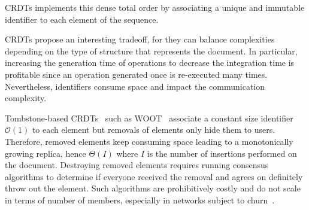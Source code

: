 CRDTs implements this dense total order by associating a unique and immutable
identifier to each element of the sequence.


\noindent CRDTs propose an interesting tradeoff, for they can balance
complexities depending on the type of structure that represents the document.
In particular, increasing the generation time of operations to decrease the
integration time is profitable since an operation generated once is re-executed
many times. Nevertheless, identifiers consume space and impact the communication
complexity.

Tombstone-based CRDTs~\cite{ahmed2011evaluating, %
  grishchenko2010deep, oster2006data, roh2011replicated, weiss2007wooki,
  wu2010partial, yu2012stringwise} such as WOOT~\cite{oster2006data} associate a
constant size identifier $\mathcal{O}(1)$ to each element but removals of
elements only hide them to users. Therefore, removed elements keep consuming
space leading to a monotonically growing replica, hence $\Theta(I)$ where $I$ is
the number of insertions performed on the document.  Destroying removed elements
requires running consensus algorithms to determine if everyone received the
removal and agrees on definitely throw out the element. Such algorithms are
prohibitively costly and do not scale in terms of number of members, especially
in networks subject to churn~\cite{mostefaoui2015signature}.

